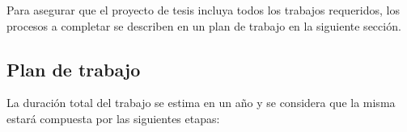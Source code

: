 \documentclass[a4paper]{article}
\begin{document}
Para asegurar que el proyecto de tesis incluya todos los trabajos requeridos, los procesos a completar se describen en un plan de trabajo en la siguiente sección.

\newpage

\subsection{Plan de trabajo}


La duración total del trabajo se estima en un año y se considera que la misma estará compuesta por las siguientes etapas:
\end{document}
